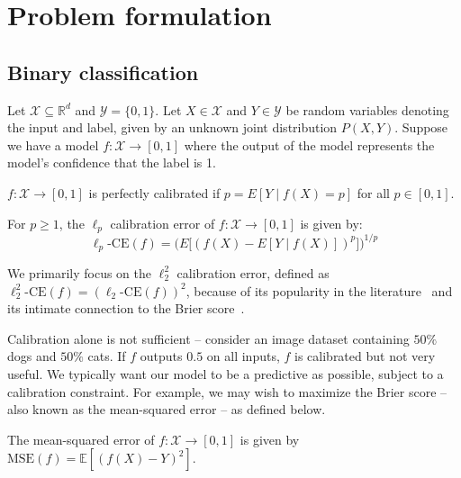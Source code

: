 \section{Problem formulation}
\label{sec:formulation}

\subsection{Binary classification}

Let $\mathcal{X} \subseteq \mathbb{R}^d$ and $\mathcal{Y} = \{0, 1\}$. Let $X \in \mathcal{X}$ and $Y \in \mathcal{Y}$ be random variables denoting the input and label, given by an unknown joint distribution $P(X, Y)$.
Suppose we have a model $f : \mathcal{X} \to [0, 1]$ where the output of the model represents the model's confidence that the label is 1.

\begin{definition}
$f : \mathcal{X} \to [0, 1]$ is perfectly calibrated if $p = E[Y \; | \; f(X) = p]$ for all $p \in [0, 1]$.
\end{definition}

\begin{definition}
For $p \geq 1$, the $\ell_p$ calibration error of $f : \mathcal{X} \to [0, 1]$ is given by:
\[ \ell_p\mbox{-CE}(f) = \Big(E\big[ (f(X) - E[Y \; | \; f(X)])^p \big] \Big)^{1/p} \]
\end{definition}

We primarily focus on the $\ell_2^2$ calibration error, defined as $\ell_2^2\mbox{-CE}(f) = (\ell_2\mbox{-CE}(f))^2$, because of its popularity in the literature~\cite{nguyen2015posterior, hendrycks2019anomaly, kuleshov2015calibrated, hendrycks2019pretraining} and its intimate connection to the Brier score~\cite{murphy1973vector,degroot1983forecasters}.

Calibration alone is not sufficient -- consider an image dataset containing $50\%$ dogs and $50\%$ cats.
If $f$ outputs $0.5$ on all inputs, $f$ is calibrated but not very useful.
We typically want our model to be a predictive as possible, subject to a calibration constraint.
For example, we may wish to maximize the Brier score -- also known as the mean-squared error -- as defined below.

\begin{definition}
The mean-squared error of $f : \mathcal{X} \to [0, 1]$ is given by $\mbox{MSE}(f) = \mathbb{E}[(f(X) - Y)^2]$.
\end{definition}

